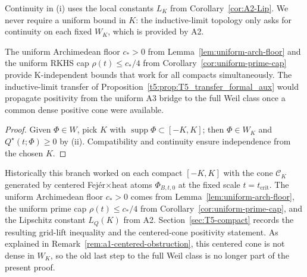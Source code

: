 \begin{remark}
Continuity in (i) uses the local constants $L_K$ from Corollary~\ref{cor:A2-Lip}. We never require a uniform bound in $K$: the inductive-limit topology only asks for continuity on each fixed $W_K$, which is provided by A2.
\end{remark}

\begin{remark}\label{rem:T5-uniform}
The uniform Archimedean floor $c_*>0$ from Lemma~\ref{lem:uniform-arch-floor}
and the uniform RKHS cap $\rho(t)\le c_*/4$ from Corollary~\ref{cor:uniform-prime-cap}
provide K-independent bounds that work for all compacts simultaneously.
The inductive-limit transfer of Proposition~\ref{t5:prop:T5_transfer_formal_aux}
would propagate positivity from the uniform A3 bridge to the full Weil class once a common dense positive cone were available.
\end{remark}

\begin{proof}
Given $\Phi\in W$, pick $K$ with $\operatorname{supp}\Phi\subset[-K,K]$; then $\Phi\in W_K$ and $Q^\star(t;\Phi)\ge0$ by (ii). Compatibility and continuity ensure independence from the chosen $K$.
\end{proof}

Historically this branch worked on each compact $[-K,K]$ with the cone $\mathcal C_K$ generated by centered Fej\'er$\times$heat atoms $\Phi_{B,t,0}$ at the fixed scale $t=t_{\mathrm{crit}}$. The uniform Archimedean floor $c_*>0$ comes from Lemma~\ref{lem:uniform-arch-floor}, the uniform prime cap $\rho(t)\le c_*/4$ from Corollary~\ref{cor:uniform-prime-cap}, and the Lipschitz constant $L_Q(K)$ from A2. Section~\ref{sec:T5-compact} records the resulting grid-lift inequality and the centered-cone positivity statement. As explained in Remark~\ref{rem:a1-centered-obstruction}, this centered cone is not dense in $W_K$, so the old last step to the full Weil class is no longer part of the present proof.
